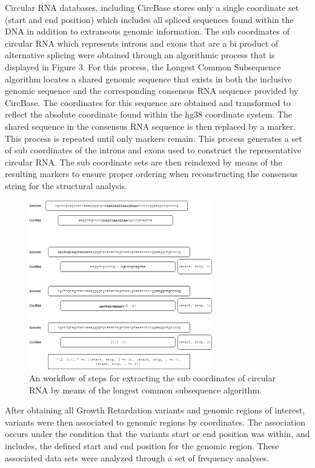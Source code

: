 \documentclass[11pt]{article}
\begin{document}
Circular RNA databases, including CircBase stores only a single coordinate set (start and end position) which includes all spliced sequences found within the DNA in addition to extraneous genomic information. The sub coordinates of circular RNA which represents introns and exons that are a bi product of alternative splicing were obtained through an algorithmic process that is displayed in Figure 3. For this process, the Longest Common Subsequence algorithm locates a shared genomic sequence that exists in both the inclusive genomic sequence and the corresponding consensus RNA sequence provided by CircBase. The coordinates for this sequence are obtained and transformed to reflect the absolute coordinate found within the hg38 coordinate system. The shared sequence in the consensus RNA sequence is then replaced by a marker. This process is repeated until only markers remain. This process generates a set of sub coordinates of the introns and exons used to construct the representative circular RNA. The sub coordinate sets are then reindexed by means of the resulting markers to ensure proper ordering when reconstructing the consensus string for the structural analysis. 


\begin{figure}[t]
	\centering
	\includegraphics[width=8cm]{circrna-algorithm}
	\caption{An workflow of steps for extracting the sub coordinates of circular RNA by means of the longest common subsequence algorithm.}
	\label{fig:mesh1}
\end{figure}

After obtaining all Growth Retardation variants and genomic regions of interest, variants were then associated to genomic regions by coordinates. The association occurs under the condition that the variants start or end position was within, and includes, the defined start and end position for the genomic region. These associated data sets were analyzed through a set of frequency analyses. 
\end{document}
